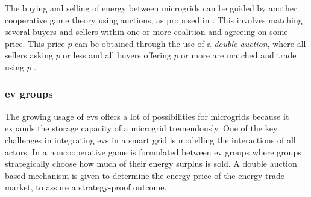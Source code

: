 The buying and selling of energy between microgrids can be guided by another cooperative game theory using auctions, as proposed in \cite{SaadHanPoorEtAl2011}. This involves matching several buyers and sellers within one or more coalition and agreeing on some price. This price $p$ can be obtained through the use of a \emph{double auction}, where all sellers asking $p$ or less and all buyers offering $p$ or more are matched and trade using $p$ \cite{gjerstad1998price}.

\subsubsection{\ac{ev} groups}
The growing usage of \ac{ev}s offers a lot of possibilities for microgrids because it expands the storage capacity of a microgrid tremendously. One of the key challenges in integrating \ac{ev}s in a smart grid is modelling the interactions of all actors. In \cite{SaadHanPoorEtAl2011} a noncooperative game is formulated between \ac{ev} groups where groups strategically choose how much of their energy surplus is sold. A double auction based mechanism is given to determine the energy price of the energy trade market, to assure a strategy-proof outcome. 




